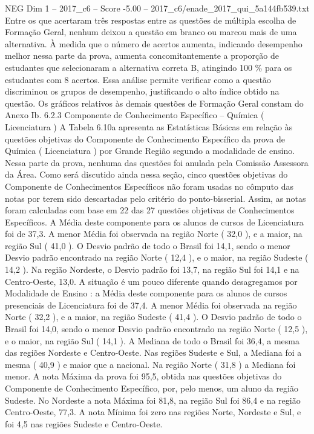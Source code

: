 \begin{textsample}{NEG Dim 1 – 2017\_c6 – Score -5.00 – 2017\_c6/enade\_2017\_qui\_5a144fb539.txt}
Entre os que acertaram três respostas entre as questões de múltipla escolha de Formação Geral, nenhum deixou a questão em branco ou marcou mais de uma alternativa.
À medida que o número de acertos aumenta, indicando desempenho melhor nessa parte da prova, aumenta concomitantemente a proporção de estudantes que selecionaram a alternativa correta B, atingindo 100 \% para os estudantes com 8 acertos.
Essa análise permite verificar como a questão discriminou os grupos de desempenho, justificando o alto índice obtido na questão.
Os gráficos relativos às demais questões de Formação Geral constam do Anexo Ib. 6.2.3 Componente de Conhecimento Específico – Química ( Licenciatura ) A Tabela 6.10a apresenta as Estatísticas Básicas em relação às questões objetivas do Componente de Conhecimento Específico da prova de Química ( Licenciatura ) por Grande Região segundo a modalidade de ensino.
Nessa parte da prova, nenhuma das questões foi anulada pela Comissão Assessora da Área.
Como será discutido ainda nessa seção, cinco questões objetivas do Componente de Conhecimentos Específicos não foram usadas no cômputo das notas por terem sido descartadas pelo critério do ponto-bisserial.
Assim, as notas foram calculadas com base em 22 das 27 questões objetivas de Conhecimentos Específicos.
A Média deste componente para os alunos de cursos de Licenciatura foi de 37,3.
A menor Média foi observada na região Norte ( 32,0 ), e a maior, na região Sul ( 41,0 ).
O Desvio padrão de todo o Brasil foi 14,1, sendo o menor Desvio padrão encontrado na região Norte ( 12,4 ), e o maior, na região Sudeste ( 14,2 ).
Na região Nordeste, o Desvio padrão foi 13,7, na região Sul foi 14,1 e na Centro-Oeste, 13,0.
A situação é um pouco diferente quando desagregamos por Modalidade de Ensino : a Média deste componente para os alunos de cursos presenciais de Licenciatura foi de 37,4.
A menor Média foi observada na região Norte ( 32,2 ), e a maior, na região Sudeste ( 41,4 ).
O Desvio padrão de todo o Brasil foi 14,0, sendo o menor Desvio padrão encontrado na região Norte ( 12,5 ), e o maior, na região Sul ( 14,1 ).
A Mediana de todo o Brasil foi 36,4, a mesma das regiões Nordeste e Centro-Oeste.
Nas regiões Sudeste e Sul, a Mediana foi a mesma ( 40,9 ) e maior que a nacional.
Na região Norte ( 31,8 ) a Mediana foi menor.
A nota Máxima da prova foi 95,5, obtida nas questões objetivas do Componente de Conhecimento Específico, por, pelo menos, um aluno da região Sudeste.
No Nordeste a nota Máxima foi 81,8, na região Sul foi 86,4 e na região Centro-Oeste, 77,3.
A nota Mínima foi zero nas regiões Norte, Nordeste e Sul, e foi 4,5 nas regiões Sudeste e Centro-Oeste.

\end{textsample}

